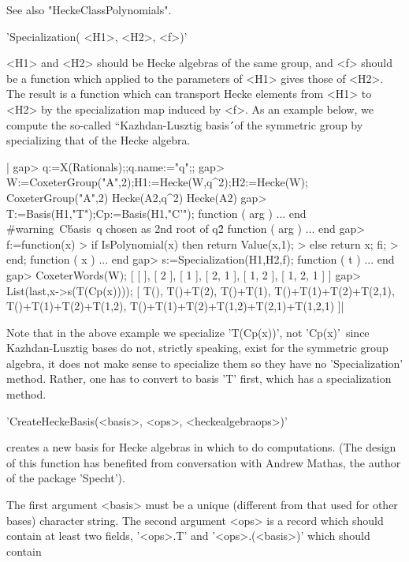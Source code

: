 See also "HeckeClassPolynomials".


'Specialization( <H1>, <H2>, <f>)'

<H1> and <H2> should be Hecke algebras of the same group, and <f> should be
a function which applied to the parameters of <H1> gives those of <H2>. The
result  is a function which can transport  Hecke elements from <H1> to <H2>
by  the specialization map induced by <f>.  As an example below, we compute
the  so-called  ``Kazhdan-Lusztig  basis\'\'\  of  the  symmetric  group by
specializing that of the Hecke algebra.

|    gap> q:=X(Rationals);;q.name:="q";;
    gap> W:=CoxeterGroup("A",2);H1:=Hecke(W,q^2);H2:=Hecke(W);
    CoxeterGroup("A",2)
    Hecke(A2,q^2)
    Hecke(A2)
    gap> T:=Basis(H1,"T");Cp:=Basis(H1,"C'");
    function ( arg ) ... end
    #warning\:\ C\' basis\:\ q chosen as 2nd root of q\^2
    function ( arg ) ... end
    gap> f:=function(x)
    >  if IsPolynomial(x) then return Value(x,1);
    >  else return x; fi;
    > end;
    function ( x ) ... end
    gap> s:=Specialization(H1,H2,f);
    function ( t ) ... end
    gap> CoxeterWords(W);
    [ [  ], [ 2 ], [ 1 ], [ 2, 1 ], [ 1, 2 ], [ 1, 2, 1 ] ]
    gap> List(last,x->s(T(Cp(x))));
    [ T(), T()+T(2), T()+T(1), T()+T(1)+T(2)+T(2,1), T()+T(1)+T(2)+T(1,2),
      T()+T(1)+T(2)+T(1,2)+T(2,1)+T(1,2,1) ]|

Note  that in  the above  example we  specialize 'T(Cp(x))', not 'Cp(x)'\:\
since  Kazhdan-Lusztig  bases  do  not,  strictly  speaking,  exist for the
symmetric  group algebra, it does not make sense to specialize them so they
have  no 'Specialization' method.  Rather, one has  to convert to basis 'T'
first, which has a specialization method.

\Section{CreateHeckeBasis}

'CreateHeckeBasis(<basis>, <ops>, <heckealgebraops>)'

creates a new basis for Hecke algebras in  which to do computations. (The
design of this   function has  benefited  from conversation  with  Andrew
Mathas, the author of the package 'Specht').

The first argument <basis> must be a unique (different from that used for
other bases)  character string.  The   second argument <ops> is  a record
which should contain at least two fields, '<ops>.T' and '<ops>.(<basis>)'
which should contain \:

